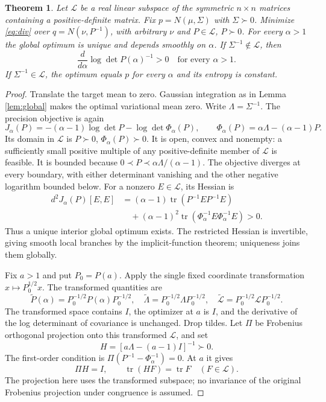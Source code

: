 \documentclass[11pt]{article}
\newtheorem{theorem}{Theorem}
\theoremstyle{remark}\newtheorem{remark}[theorem]{Remark}
\begin{document}
\begin{theorem}\label{thm:entropy}
Let $\mathcal L$ be a real linear subspace of the symmetric $n\times n$
matrices containing a positive-definite matrix. Fix $p=N(\mu,\Sigma)$
with $\Sigma\succ0$. Minimize \eqref{eq:div} over
$q=N(\nu,P^{-1})$, with arbitrary $\nu$ and
$P\in\mathcal L$, $P\succ0$.
For every $\alpha>1$ the global optimum is unique and depends smoothly
on $\alpha$. If $\Sigma^{-1}\notin\mathcal L$, then
\[
 \frac{d}{d\alpha}\log\det P(\alpha)^{-1}>0
 \quad\text{for every }\alpha>1.
\]
If $\Sigma^{-1}\in\mathcal L$, the optimum equals $p$ for every $\alpha$
and its entropy is constant.
\end{theorem}

\begin{proof}
Translate the target mean to zero. Gaussian integration as in
Lemma \ref{lem:global} makes the optimal variational mean zero.
Write $\Lambda=\Sigma^{-1}$. The precision objective is again
\[
 J_\alpha(P)=-(\alpha-1)\log\det P-\log\det\Phi_\alpha(P),
 \qquad \Phi_\alpha(P)=\alpha\Lambda-(\alpha-1)P.
\]
Its domain in $\mathcal L$ is $P\succ0$, $\Phi_\alpha(P)\succ0$.
It is open, convex and nonempty: a sufficiently small positive multiple
of any positive-definite member of $\mathcal L$ is feasible.
It is bounded because $0\prec P\prec\alpha\Lambda/(\alpha-1)$.
The objective diverges at every boundary, with either determinant
vanishing and the other negative logarithm bounded below.
For a nonzero $E\in\mathcal L$, its Hessian is
\begin{align*}
 d^2J_\alpha(P)[E,E]
 &=(\alpha-1)\operatorname{tr}(P^{-1}EP^{-1}E)\\
 &\quad+(\alpha-1)^2
   \operatorname{tr}(\Phi_\alpha^{-1}E\Phi_\alpha^{-1}E)>0.
\end{align*}
Thus a unique interior global optimum exists. The restricted Hessian
is invertible, giving smooth local branches by the implicit-function
theorem; uniqueness joins them globally.

Fix $a>1$ and put $P_0=P(a)$. Apply the single fixed coordinate
transformation $x\mapsto P_0^{1/2}x$. The transformed quantities are
\[
 \widetilde P(\alpha)=P_0^{-1/2}P(\alpha)P_0^{-1/2},\quad
 \widetilde\Lambda=P_0^{-1/2}\Lambda P_0^{-1/2},\quad
 \widetilde{\mathcal L}=P_0^{-1/2}\mathcal L P_0^{-1/2}.
\]
The transformed space contains $I$, the optimizer at $a$ is $I$, and
the derivative of the log determinant of covariance is unchanged.
Drop tildes. Let $\Pi$ be Frobenius orthogonal projection onto this
transformed $\mathcal L$, and set
\[
 H=[a\Lambda-(a-1)I]^{-1}\succ0.
\]
The first-order condition is
$\Pi(P^{-1}-\Phi_\alpha^{-1})=0$. At $a$ it gives
\begin{equation}\label{eq:projectstation}
 \Pi H=I,\qquad \operatorname{tr}(HF)=\operatorname{tr}F
 \quad(F\in\mathcal L).
\end{equation}
The projection here uses the transformed subspace; no invariance of
the original Frobenius projection under congruence is assumed.


\end{proof}
\end{document}
